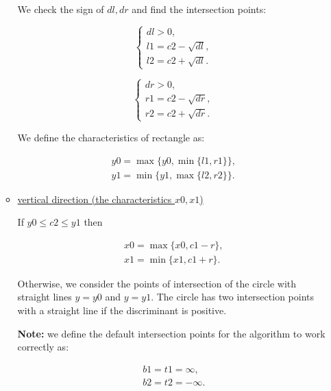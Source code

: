 \documentclass{report}
\begin{document}
\begin{itemize}
\begin{itemize}
			We check the sign of $dl, dr$ and find the intersection points:
			
			\begin{equation}
				\begin{cases}
			     	dl > 0,\\ 
					l1 = c2 - \sqrt {dl},\\
					l2 = c2 + \sqrt {dl}.
				\end{cases}
		 	\end{equation}
	 	
			\begin{equation}
				\begin{cases}
					dr > 0,\\ 
					r1 = c2 - \sqrt {dr},\\
					r2 = c2 + \sqrt {dr}.
				\end{cases}
			\end{equation}
			
			We define the characteristics of rectangle as:
			
			\begin{equation}
				\begin{gathered}
					y0 = \max\{y0, \min\{l1, r1\}\},\\
					y1 = \min\{y1, \max\{l2, r2\}\}.
				\end{gathered}
			\end{equation}
				
			\item \underline {vertical direction (the characteristics $x0, x1$) }
			
			If   $y0 \le c2 \le y1$ then
			
			\begin{equation}
				\begin{gathered}
					x0 = \max\{x0, c1-r\},\\
					x1 = \min\{x1, c1+r\}.
				\end{gathered}
		\end{equation}
	
			Otherwise, we consider the points of intersection of the circle with straight lines $y = y0$ and $y = y1$. The circle has two intersection points with a straight line if the discriminant is positive.
			
			{\bfseries Note:} we define the default intersection points for the algorithm to work correctly as:
			
			\begin{equation}
				\begin{gathered}
					b1 = t1 =  \infty,\\
					b2 = t2 = -\infty.
			\end{gathered}
		\end{equation}
		

\end{itemize}
\end{itemize}
\end{document}
